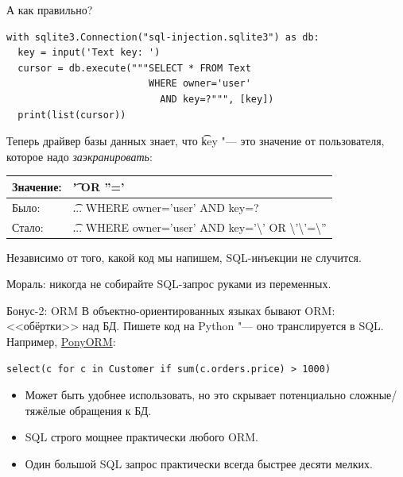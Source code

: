 \begin{frame}[fragile]{А как правильно?}
\begin{verbatim}
with sqlite3.Connection("sql-injection.sqlite3") as db:
  key = input('Text key: ')
  cursor = db.execute("""SELECT * FROM Text
                         WHERE owner='user'
                           AND key=?""", [key])
  print(list(cursor))
\end{verbatim}
	Теперь драйвер базы данных знает, что \t{key} "--- это значение от пользователя,
	которое надо \textit{заэкранировать}:
	\begin{center}
		\begin{tabular}{ll}
			Значение: & \t{' OR ''='} \\\hline
			Было:  & \t{... WHERE owner='user' AND key=?} \\\hline
			Стало: & \t{... WHERE owner='user' AND key='\textbackslash' OR  \textbackslash'\textbackslash'=\textbackslash''} \\
		\end{tabular}
	\end{center}
	Независимо от того, какой код мы напишем, SQL-инъекции не случится.

	Мораль: никогда не собирайте SQL-запрос руками из переменных.
\end{frame}

\begin{frame}[fragile]{Бонус-2: ORM}
	В объектно-ориентированных языках бывают ORM: <<обёртки>> над БД.
	Пишете код на Python "--- оно транслируется в SQL.
	Например, \href{https://ponyorm.org/}{PonyORM}:
\begin{verbatim}
select(c for c in Customer if sum(c.orders.price) > 1000)
\end{verbatim}

	\begin{itemize}
	\item Может быть удобнее использовать, но это скрывает потенциально сложные/тяжёлые обращения к БД.
	\item SQL строго мощнее практически любого ORM.
	\item Один большой SQL запрос практически всегда быстрее десяти мелких.
	\end{itemize}
\end{frame}
